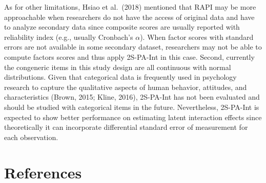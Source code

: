 \documentclass[
  man]{apa6}
\begin{document}
As for other limitations, Hsiao et al.~(2018) mentioned that RAPI may be more approachable when researchers do not have the access of original data and have to analyze secondary data since composite scores are usually reported with reliability index (e.g., usually Cronbach's \(\alpha\)). When factor scores with standard errors are not available in some secondary dataset, researchers may not be able to compute factors scores and thus apply 2S-PA-Int in this case. Second, currently the congeneric items in this study design are all continuous with normal distributions. Given that categorical data is frequently used in psychology research to capture the qualitative aspects of human behavior, attitudes, and characteristics (Brown, 2015; Kline, 2016), 2S-PA-Int has not been evaluated and should be studied with categorical items in the future. Nevertheless, 2S-PA-Int is expected to show better performance on estimating latent interaction effects since theoretically it can incorporate differential standard error of measurement for each observation.

\newpage

\hypertarget{references}{%
\section{References}\label{references}}
\end{document}
